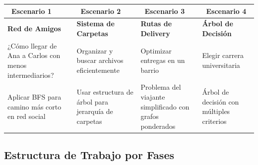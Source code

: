 \documentclass[12pt,a4paper]{article}
\begin{document}
	\begin{center}
		\begin{tabular}{|p{}|p{}|p{}|p{}|}
			\hline
			\cellcolor{primaryblue!20}\textbf{\faUsers\ Escenario 1} & 
			\cellcolor{secondarygreen!20}\textbf{\faFolder\ Escenario 2} & 
			\cellcolor{warningorange!20}\textbf{\faTruck\ Escenario 3} & 
			\cellcolor{purple!20}\textbf{\faGraduationCap\ Escenario 4} \\
			\hline
			\textbf{Red de Amigos} & \textbf{Sistema de Carpetas} & \textbf{Rutas de Delivery} & \textbf{Árbol de Decisión} \\
			\hline
			¿Cómo llegar de Ana a Carlos con menos intermediarios? & Organizar y buscar archivos eficientemente & Optimizar entregas en un barrio & Elegir carrera universitaria \\
			\hline
			\small Aplicar BFS para camino más corto en red social & \small Usar estructura de árbol para jerarquía de carpetas & \small Problema del viajante simplificado con grafos ponderados & \small Árbol de decisión con múltiples criterios \\
			\hline
		\end{tabular}
	\end{center}
	
	\subsection*{Estructura de Trabajo por Fases}
	
\end{document}
